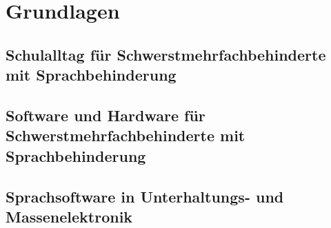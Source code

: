 \section{Grundlagen}

\subsection{Schulalltag für Schwerstmehrfachbehinderte mit Sprachbehinderung}
\subsection{Software und Hardware für Schwerstmehrfachbehinderte mit Sprachbehinderung}
\subsection{Sprachsoftware in Unterhaltungs- und Massenelektronik}